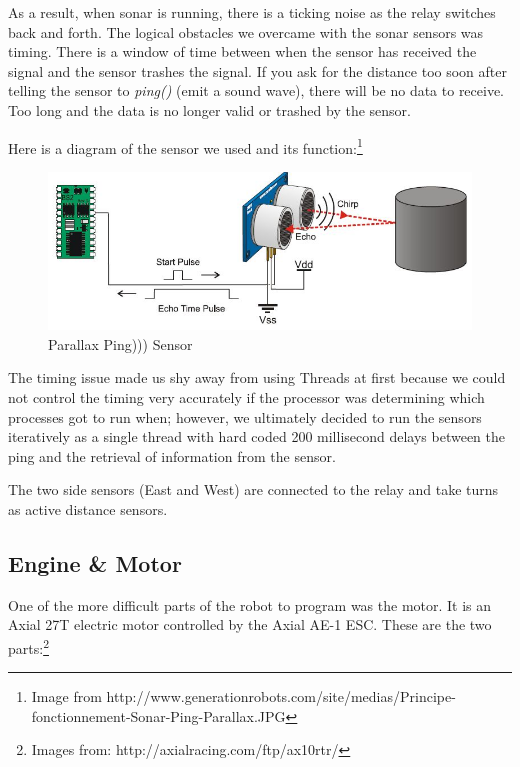 \documentclass[12pt]{article}
\begin{document}
	As a result, when sonar is running, there is a ticking noise as the relay switches back and forth.  The logical obstacles we overcame with the sonar sensors was timing.  There is a window of time between when the sensor has received the signal and the sensor trashes the signal.  If you ask for the distance too soon after telling the sensor to \textit{ping()} (emit a sound wave), there will be no data to receive.  Too long and the data is no longer valid or trashed by the sensor.

Here is a diagram of the sensor we used and its function:\footnote{Image from http://www.generationrobots.com/site/medias/Principe-fonctionnement-Sonar-Ping-Parallax.JPG}

\begin{figure}[h]
\centerline{\includegraphics[scale=.8]{img/sonar}}
\caption{Parallax Ping))) Sensor}
\end{figure}

The timing issue made us shy away from using Threads at first because we could not control the timing very accurately if the processor was determining which processes got to run when; however, we ultimately decided to run the sensors iteratively as a single thread with hard coded 200 millisecond delays between the ping and the retrieval of information from the sensor.

The two side sensors (East and West) are connected to the relay and take turns as active distance sensors.

\clearpage
\subsection{Engine \& Motor}
One of the more difficult parts of the robot to program was the motor.  It is an Axial 27T electric motor controlled by the Axial AE-1 ESC.  These are the two parts:\footnote{Images from: http://axialracing.com/ftp/ax10rtr/}
\end{document}
